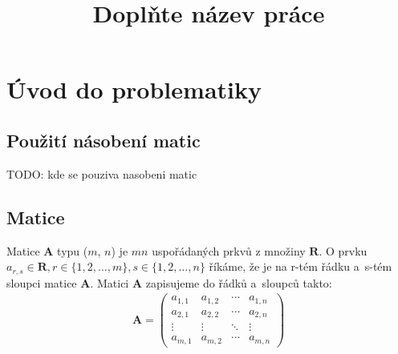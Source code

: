 \documentclass[thesis=B,czech]{FITthesis}[2012/06/26]
\title{Doplňte název práce}
\begin{document}

\begin{introduction}
\end{introduction}


\chapter{Úvod do problematiky}

\section{Použití násobení matic}

TODO: kde se pouziva nasobeni matic

\section{Matice}

Matice \textbf{A} typu ($m$, $n$) je $m n$ uspořádaných prkvů z množiny $\mathbf{R}$. O prvku $a_{r,s} \in \mathbf{R}, r \in \{1,2,\hdots,m\},s \in \{1,2,\hdots,n\}$ říkáme, že je na r-tém řádku a~s-tém sloupci matice \textbf{A}. Matici \textbf{A} zapisujeme do řádků a~sloupců takto:
\begin{align}
\mathbf{A}=\begin{pmatrix}
a_{1,1} & a_{1,2} & \cdots & a_{1,n} \\
a_{2,1} & a_{2,2} & \cdots & a_{2,n} \\
\vdots  & \vdots  & \ddots & \vdots  \\
a_{m,1} & a_{m,2} & \cdots & a_{m,n}
\end{pmatrix}
\end{align}
\end{document}
